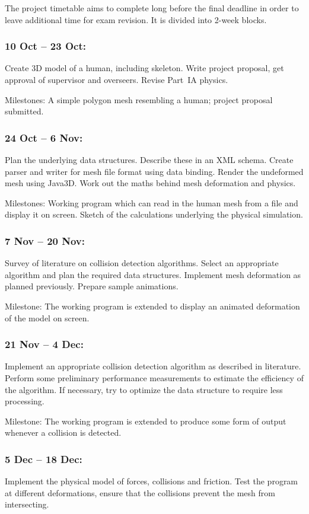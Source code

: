 \documentclass{article}
\begin{document}
The project timetable aims to complete long before the final deadline
in order to leave additional time for exam revision. It is divided
into 2-week blocks.

\subsubsection*{10 Oct -- 23 Oct:}
Create 3D model of a human, including skeleton. Write project proposal,
get approval of supervisor and overseers. Revise Part~IA physics.

Milestones: A simple polygon mesh resembling a human; project proposal
submitted.

\subsubsection*{24 Oct -- 6 Nov:}
Plan the underlying data structures. Describe these in an XML schema.
Create parser and writer for mesh file format using data binding.
Render the undeformed mesh using Java3D. Work out the maths behind
mesh deformation and physics.

Milestones: Working program which can read in the human mesh from a
file and display it on screen. Sketch of the calculations underlying
the physical simulation.

\subsubsection*{7 Nov -- 20 Nov:}
Survey of literature on collision detection algorithms. Select an
appropriate algorithm and plan the required data structures.
Implement mesh deformation as planned previously. Prepare sample
animations.

Milestone: The working program is extended to display an animated
deformation of the model on screen.

\subsubsection*{21 Nov -- 4 Dec:}
Implement an appropriate collision detection algorithm as described
in literature. Perform some preliminary performance measurements to
estimate the efficiency of the algorithm. If necessary, try to
optimize the data structure to require less processing.

Milestone: The working program is extended to produce some form of
output whenever a collision is detected.

\subsubsection*{5 Dec -- 18 Dec:}
Implement the physical model of forces, collisions and friction. Test
the program at different deformations, ensure that the collisions
prevent the mesh from intersecting.
\end{document}
